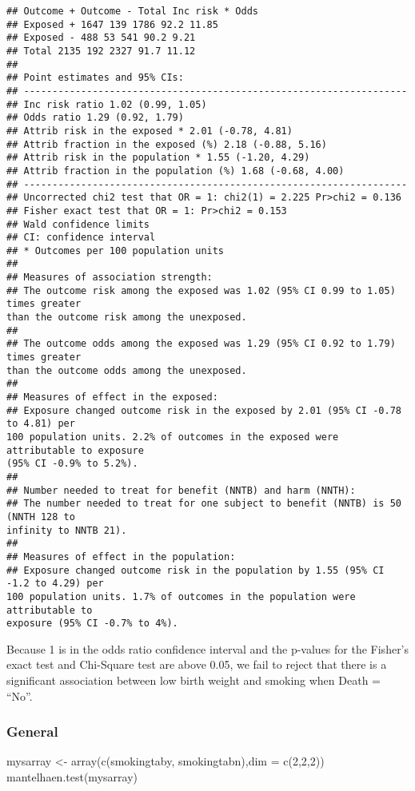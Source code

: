 \documentclass[
]{article}
\newenvironment{Shaded}{\begin{snugshade}}{\end{snugshade}}
\newcommand{\AttributeTok}[1]{\textcolor[rgb]{0.77,0.63,0.00}{#1}}
\newcommand{\DecValTok}[1]{\textcolor[rgb]{0.00,0.00,0.81}{#1}}
\newcommand{\FunctionTok}[1]{\textcolor[rgb]{0.00,0.00,0.00}{#1}}
\newcommand{\NormalTok}[1]{#1}
\newcommand{\OtherTok}[1]{\textcolor[rgb]{0.56,0.35,0.01}{#1}}
\begin{document}
\begin{verbatim}
## Outcome + Outcome - Total Inc risk * Odds
## Exposed + 1647 139 1786 92.2 11.85
## Exposed - 488 53 541 90.2 9.21
## Total 2135 192 2327 91.7 11.12
##
## Point estimates and 95% CIs:
## -------------------------------------------------------------------
## Inc risk ratio 1.02 (0.99, 1.05)
## Odds ratio 1.29 (0.92, 1.79)
## Attrib risk in the exposed * 2.01 (-0.78, 4.81)
## Attrib fraction in the exposed (%) 2.18 (-0.88, 5.16)
## Attrib risk in the population * 1.55 (-1.20, 4.29)
## Attrib fraction in the population (%) 1.68 (-0.68, 4.00)
## -------------------------------------------------------------------
## Uncorrected chi2 test that OR = 1: chi2(1) = 2.225 Pr>chi2 = 0.136
## Fisher exact test that OR = 1: Pr>chi2 = 0.153
## Wald confidence limits
## CI: confidence interval
## * Outcomes per 100 population units
##
## Measures of association strength:
## The outcome risk among the exposed was 1.02 (95% CI 0.99 to 1.05) times greater
than the outcome risk among the unexposed.
##
## The outcome odds among the exposed was 1.29 (95% CI 0.92 to 1.79) times greater
than the outcome odds among the unexposed.
##
## Measures of effect in the exposed:
## Exposure changed outcome risk in the exposed by 2.01 (95% CI -0.78 to 4.81) per
100 population units. 2.2% of outcomes in the exposed were attributable to exposure
(95% CI -0.9% to 5.2%).
##
## Number needed to treat for benefit (NNTB) and harm (NNTH):
## The number needed to treat for one subject to benefit (NNTB) is 50 (NNTH 128 to
infinity to NNTB 21).
##
## Measures of effect in the population:
## Exposure changed outcome risk in the population by 1.55 (95% CI -1.2 to 4.29) per
100 population units. 1.7% of outcomes in the population were attributable to
exposure (95% CI -0.7% to 4%).
\end{verbatim}

Because 1 is in the odds ratio confidence interval and the p-values for
the Fisher's exact test and Chi-Square test are above 0.05, we fail to
reject that there is a significant association between low birth weight
and smoking when Death = ``No''.

\hypertarget{general}{%
\subsubsection{General}\label{general}}

\begin{Shaded}
\begin{Highlighting}[]
\NormalTok{mysarray }\OtherTok{\textless{}{-}} \FunctionTok{array}\NormalTok{(}\FunctionTok{c}\NormalTok{(smokingtaby, smokingtabn),}\AttributeTok{dim =} \FunctionTok{c}\NormalTok{(}\DecValTok{2}\NormalTok{,}\DecValTok{2}\NormalTok{,}\DecValTok{2}\NormalTok{))}
\FunctionTok{mantelhaen.test}\NormalTok{(mysarray)}
\end{Highlighting}
\end{Shaded}
\end{document}
